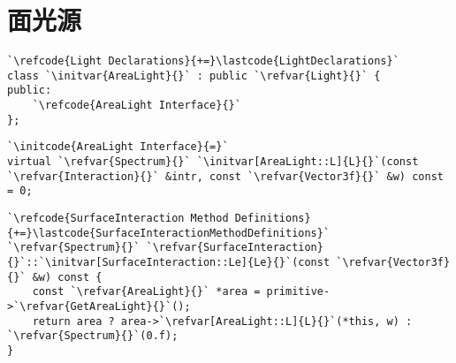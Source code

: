 \section{面光源}\label{sec:面光源}

\begin{lstlisting}
`\refcode{Light Declarations}{+=}\lastcode{LightDeclarations}`
class `\initvar{AreaLight}{}` : public `\refvar{Light}{}` {
public:
    `\refcode{AreaLight Interface}{}`
};
\end{lstlisting}

\begin{lstlisting}
`\initcode{AreaLight Interface}{=}`
virtual `\refvar{Spectrum}{}` `\initvar[AreaLight::L]{L}{}`(const `\refvar{Interaction}{}` &intr, const `\refvar{Vector3f}{}` &w) const = 0;
\end{lstlisting}

\begin{lstlisting}
`\refcode{SurfaceInteraction Method Definitions}{+=}\lastcode{SurfaceInteractionMethodDefinitions}`
`\refvar{Spectrum}{}` `\refvar{SurfaceInteraction}{}`::`\initvar[SurfaceInteraction::Le]{Le}{}`(const `\refvar{Vector3f}{}` &w) const {
    const `\refvar{AreaLight}{}` *area = primitive->`\refvar{GetAreaLight}{}`();
    return area ? area->`\refvar[AreaLight::L]{L}{}`(*this, w) : `\refvar{Spectrum}{}`(0.f);
}
\end{lstlisting}